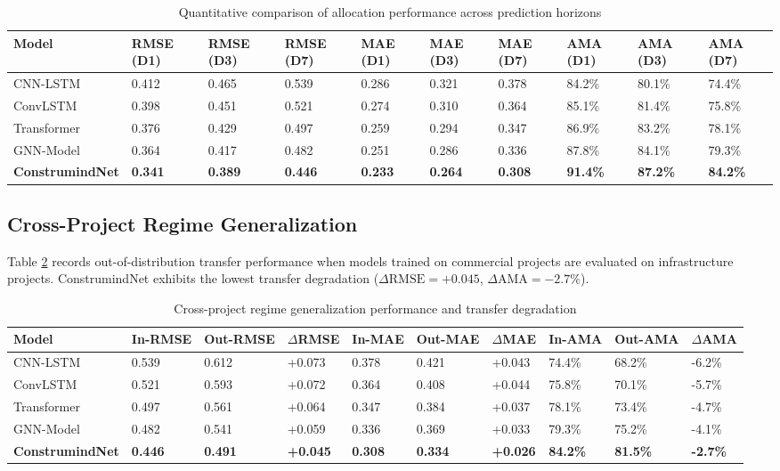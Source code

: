\documentclass[pdflatex,sn-mathphys,Numbered]{sn-jnl}%
\begin{document}
\begin{table}[t]
\caption{Quantitative comparison of allocation performance across prediction horizons}\label{tab4}
\begin{tabular*}{\textwidth}{@{\extracolsep\fill}llllllllll@{\extracolsep\fill}}
\toprule
Model & RMSE (D1) & RMSE (D3) & RMSE (D7) & MAE (D1) & MAE (D3) & MAE (D7) & AMA (D1) & AMA (D3) & AMA (D7) \\
\midrule
CNN-LSTM \cite{inam2024} & 0.412 & 0.465 & 0.539 & 0.286 & 0.321 & 0.378 & 84.2\% & 80.1\% & 74.4\% \\
ConvLSTM \cite{shin2023} & 0.398 & 0.451 & 0.521 & 0.274 & 0.310 & 0.364 & 85.1\% & 81.4\% & 75.8\% \\
Transformer \cite{inam2025a} & 0.376 & 0.429 & 0.497 & 0.259 & 0.294 & 0.347 & 86.9\% & 83.2\% & 78.1\% \\
GNN-Model \cite{liu2025} & 0.364 & 0.417 & 0.482 & 0.251 & 0.286 & 0.336 & 87.8\% & 84.1\% & 79.3\% \\
\textbf{ConstrumindNet} & \textbf{0.341} & \textbf{0.389} & \textbf{0.446} & \textbf{0.233} & \textbf{0.264} & \textbf{0.308} & \textbf{91.4\%} & \textbf{87.2\%} & \textbf{84.2\%} \\
\bottomrule
\end{tabular*}
\end{table}

\subsection{Cross-Project Regime Generalization}
Table \ref{tab5} records out-of-distribution transfer performance when models trained on commercial projects are evaluated on infrastructure projects. ConstrumindNet exhibits the lowest transfer degradation ($\Delta\text{RMSE} = +0.045$, $\Delta\text{AMA} = -2.7\%$).

\begin{table}[t]
\caption{Cross-project regime generalization performance and transfer degradation}\label{tab5}
\begin{tabular*}{\textwidth}{@{\extracolsep\fill}llllllllll@{\extracolsep\fill}}
\toprule
Model & In-RMSE & Out-RMSE & $\Delta$RMSE & In-MAE & Out-MAE & $\Delta$MAE & In-AMA & Out-AMA & $\Delta$AMA \\
\midrule
CNN-LSTM & 0.539 & 0.612 & +0.073 & 0.378 & 0.421 & +0.043 & 74.4\% & 68.2\% & -6.2\% \\
ConvLSTM & 0.521 & 0.593 & +0.072 & 0.364 & 0.408 & +0.044 & 75.8\% & 70.1\% & -5.7\% \\
Transformer & 0.497 & 0.561 & +0.064 & 0.347 & 0.384 & +0.037 & 78.1\% & 73.4\% & -4.7\% \\
GNN-Model & 0.482 & 0.541 & +0.059 & 0.336 & 0.369 & +0.033 & 79.3\% & 75.2\% & -4.1\% \\
\textbf{ConstrumindNet} & \textbf{0.446} & \textbf{0.491} & \textbf{+0.045} & \textbf{0.308} & \textbf{0.334} & \textbf{+0.026} & \textbf{84.2\%} & \textbf{81.5\%} & \textbf{-2.7\%} \\
\bottomrule
\end{tabular*}
\end{table}
\end{document}
